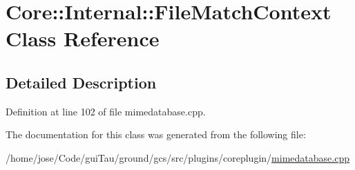 \hypertarget{class_core_1_1_internal_1_1_file_match_context}{\section{Core\-:\-:Internal\-:\-:File\-Match\-Context Class Reference}
\label{class_core_1_1_internal_1_1_file_match_context}
}


\subsection{Detailed Description}


Definition at line 102 of file mimedatabase.\-cpp.



The documentation for this class was generated from the following file\-:\begin{DoxyCompactItemize}
\item 
/home/jose/\-Code/gui\-Tau/ground/gcs/src/plugins/coreplugin/\hyperlink{mimedatabase_8cpp}{mimedatabase.\-cpp}\end{DoxyCompactItemize}
